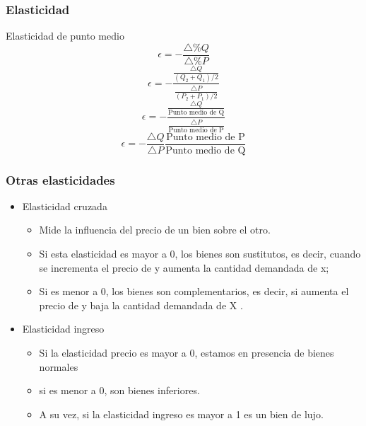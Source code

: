 \documentclass{beamer}
\begin{document}
\begin{frame}
\frametitle{Elasticidad}
\small 
\centering
\begin{block}{Elasticidad de punto medio}
\begin{equation} 
\epsilon = -  \frac{\bigtriangleup \% Q}{\bigtriangleup \% P}
\end{equation}
\begin{equation}
\epsilon = -  \frac{\frac{\bigtriangleup Q}{(Q_2+Q_1)/2}}{\frac{\bigtriangleup P}{(P_2+P_1)/2}}
\end{equation}
\begin{equation}
\epsilon = - \frac{\frac{\bigtriangleup Q}{\text{Punto medio de Q}}}{\frac{\bigtriangleup P}{\text{Punto medio de P}}}
\end{equation}
\begin{equation}
\epsilon = - \frac{\bigtriangleup Q}{ \bigtriangleup P} \frac{\text{Punto medio de P}}{\text{Punto medio de Q}}
\end{equation}
\end{block}
\end{frame}


\begin{frame}
\frametitle{Otras elasticidades}
\begin{itemize}
    \item Elasticidad cruzada
    \begin{itemize}
        \item Mide la influencia del precio de un bien sobre el otro.
        \item Si esta elasticidad es mayor a 0, los bienes son sustitutos, es decir, cuando se incrementa el precio de y aumenta la cantidad demandada de x; 
        \item Si es menor a 0, los bienes son complementarios, es decir, si aumenta el precio de y baja la cantidad demandada de X . \vspace{4mm}
    \end{itemize}
    \item Elasticidad ingreso
        \begin{itemize}
        \item Si la elasticidad precio es mayor a 0, estamos en presencia de bienes normales
        \item si es menor a 0, son bienes inferiores. 
        \item A su vez, si la elasticidad ingreso es mayor a 1 es un bien de lujo.
    \end{itemize}
\end{itemize}
\end{frame}
\end{document}
